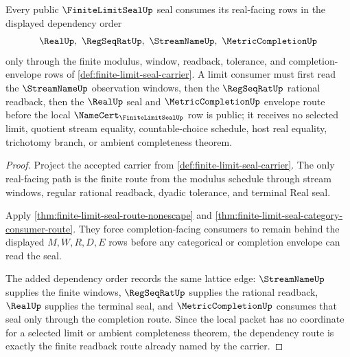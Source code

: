 \begin{theorem}
\label{thm:finite-limit-seal-real-dependency-route}
Every public $\FiniteLimitSealUp$ seal consumes its real-facing rows in the displayed dependency order
$$
\RealUp,\ \RegSeqRatUp,\ \StreamNameUp,\ \MetricCompletionUp
$$
only through the finite modulus, window, readback, tolerance, and completion-envelope rows of \autoref{def:finite-limit-seal-carrier}. A limit consumer must first read the $\StreamNameUp$ observation windows, then the $\RegSeqRatUp$ rational readback, then the $\RealUp$ seal and $\MetricCompletionUp$ envelope route before the local $\NameCert_{\FiniteLimitSealUp}$ row is public; it receives no selected limit, quotient stream equality, countable-choice schedule, host real equality, trichotomy branch, or ambient completeness theorem.
\end{theorem}
\begin{proof}
Project the accepted carrier from \autoref{def:finite-limit-seal-carrier}. The only real-facing path is the finite route from the modulus schedule through stream windows, regular rational readback, dyadic tolerance, and terminal Real seal.

Apply \autoref{thm:finite-limit-seal-route-nonescape} and \autoref{thm:finite-limit-seal-category-consumer-route}. They force completion-facing consumers to remain behind the displayed $M,W,R,D,E$ rows before any categorical or completion envelope can read the seal.

The added dependency order records the same lattice edge: $\StreamNameUp$ supplies the finite windows, $\RegSeqRatUp$ supplies the rational readback, $\RealUp$ supplies the terminal seal, and $\MetricCompletionUp$ consumes that seal only through the completion route. Since the local packet has no coordinate for a selected limit or ambient completeness theorem, the dependency route is exactly the finite readback route already named by the carrier.
\end{proof}

